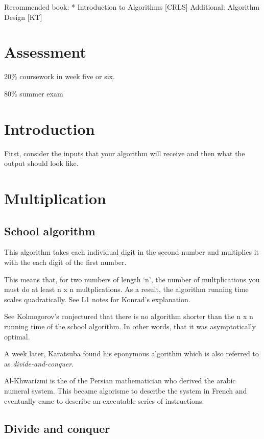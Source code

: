 Recommended book: * Introduction to Algorithms {[}CRLS{]} Additional:
Algorithm Design {[}KT{]}

\hypertarget{assessment}{%
\section{Assessment}\label{assessment}}

20\% coursework in week five or six.

80\% summer exam

\hypertarget{introduction}{%
\section{Introduction}\label{introduction}}

First, consider the inputs that your algorithm will receive and then
what the output should look like.

\hypertarget{multiplication}{%
\section{Multiplication}\label{multiplication}}

\hypertarget{school-algorithm}{%
\subsection{School algorithm}\label{school-algorithm}}

This algorithm takes each individual digit in the second number and
multiplies it with the each digit of the first number.

This means that, for two numbers of length `n', the number of
multplications you must do at least n x n multplications. As a result,
the algorithm running time scales quadratically. See L1 notes for
Konrad's explanation.

See Kolmogorov's conjectured that there is no algorithm shorter than the
n x n running time of the school algorithm. In other words, that it was
asymptotically optimal.

A week later, Karatsuba found his eponymous algorithm which is also
referred to as \emph{divide-and-conquer}.

Al-Khwarizmi is the of the Persian mathematician who derived the arabic
numeral system. This became algorisme to describe the system in French
and eventually came to describe an executable series of instructions.

\hypertarget{divide-and-conquer}{%
\subsection{Divide and conquer}\label{divide-and-conquer}}

